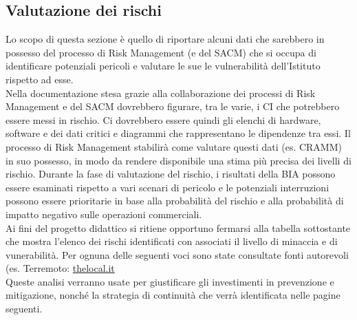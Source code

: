 \subsection{Valutazione dei rischi}
\label{rischi}
Lo scopo di questa sezione è quello di riportare alcuni dati che sarebbero in possesso del processo di Risk Management (e del SACM) che si occupa di identificare potenziali pericoli e valutare le sue le  vulnerabilità dell'Istituto rispetto ad esse.
\vspace{0.5cm} \\
Nella documentazione stesa grazie alla collaborazione dei processi di Risk Management e del SACM dovrebbero figurare, tra le varie, i CI che potrebbero essere messi in rischio. Ci dovrebbero essere quindi gli elenchi di hardware, software e dei dati critici e diagrammi che rappresentano le dipendenze tra essi. 
Il processo di Risk Management stabilirà come valutare questi dati (es. CRAMM) in suo possesso, in modo da rendere disponibile una stima più precisa dei livelli di rischio. Durante la fase di valutazione del rischio, i risultati della BIA possono essere esaminati rispetto a vari scenari di pericolo e le potenziali interruzioni possono essere prioritarie in base alla probabilità del rischio e alla probabilità di impatto negativo sulle operazioni commerciali.
\vspace{0.5cm} \\
Ai fini del progetto didattico si ritiene opportuno fermarsi alla tabella sottostante che mostra l'elenco dei rischi identificati con associati il livello di minaccia e di vunerabilità. Per ognuna delle seguenti voci sono state consultate fonti autorevoli (es. Terremoto: \href{https://www.thelocal.it/20161028/which-areas-of-italy-have-the-highest-risk-of-earthquakes}{thelocal.it}
\vspace{0.5cm} \\
Queste analisi verranno usate per giustificare gli investimenti in prevenzione e mitigazione, nonché la strategia di continuità che verrà identificata nelle pagine seguenti.
\newpage

